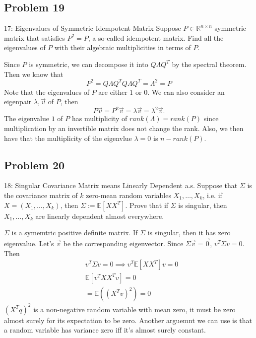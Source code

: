 \documentclass[../main]{subfiles}
\begin{document}
\subsection{Problem 19}

\begin{bbox}{17: Eigenvalues of Symmetric Idempotent Matrix}
    Suppose $P\in \mathbb R^{n\times n}$ symmetric matrix that satisfies $P^2 = P$, a so-called idempotent matrix. Find all the eigenvalues of $P$ with their algebraic multiplicities in terms of $P$.
\end{bbox}
\begin{solution}
    Since $P$ is symmetric, we can decompose it into $Q \Lambda Q^T$ by the spectral theorem. Then we know that 
    \[
    P^2 = Q\Lambda Q^T Q \Lambda Q^T = \Lambda^2 = P
    \]
    Note that the eigenvalues of $P$ are either $1$ or $0$.
    \newline
    We can also consider an eigenpair $\lambda, \vec v$ of $P$, then 
    \[
    P\vec v = P^2 \vec v = \lambda\vec v = \lambda^2 \vec v.
    \]
    The eigenvalue $1$ of $P$ has multiplicity of $rank (\Lambda) = rank(P)$ since multiplication by an invertible matrix does not change the rank. Also, we then have that the multiplicity of the eigenvlue $\lambda=0$ is $n-rank(P)$.
\end{solution}

\subsection{Problem 20}

\begin{bbox}{18: Singular Covariance Matrix means Linearly Dependent a.s.}
    Suppose that $\Sigma$ is the covariance matrix of $k$ zero-mean random variables $X_1,\dots, X_k$, i.e. if $X=(X_1, \dots, X_k)$, then $\Sigma:= \mathbb E[XX^T]$. Prove that if $\Sigma$ is singular, then $X_1,\dots, X_k$ are linearly dependent almost everywhere.
\end{bbox}
\begin{solution}
    $\Sigma$ is a symemtric positive definite matrix. If $\Sigma$ is singular, then it has zero eigenvalue. Let's $\vec v$ be the corresponding eigenvector. Since $\Sigma \vec v=\vec 0$, $v^T \Sigma v = 0$. Then
    \begin{align*}
    &v^T \Sigma v = 0\implies v^T \mathbb E[XX^T]v=0\\
    &\mathbb E[v^TXX^Tv] = 0\\
    &= \mathbb E ((X^T v)^2) = 0
    \end{align*}
    $(X^Tq)^2$ is a non-negative random variable with mean zero, it must be zero almost surely for its expectation to be zero.
    \newline
    Another arguemnt we can use is that a random variable has variance zero iff it's almost surely constant.
\end{solution}
\end{document}
